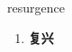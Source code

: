 
\begin{frame}
{\huge resurgence}
\begin{center}
\begin{enumerate}\Large
  \item \textbf{复兴}
\end{enumerate}
\end{center}
\end{frame}
